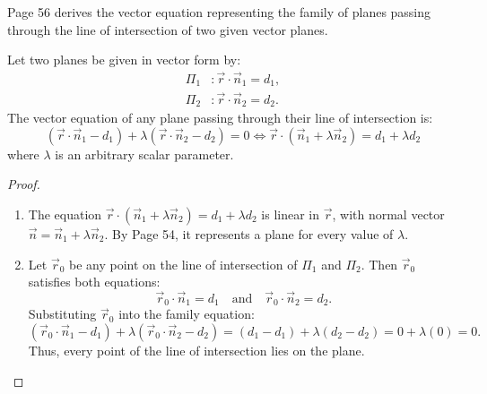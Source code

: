 \begin{conceptbox}
Page 56 derives the vector equation representing the family of planes passing through the line of intersection of two given vector planes.
\end{conceptbox}

\begin{theorembox}
Let two planes be given in vector form by:
\begin{align}
    \Pi_1 &: \vec{r} \cdot \vec{n}_1 = d_1, \\
    \Pi_2 &: \vec{r} \cdot \vec{n}_2 = d_2.
\end{align}
The vector equation of any plane passing through their line of intersection is:
\begin{equation}
    \boxed{(\vec{r} \cdot \vec{n}_1 - d_1) + \lambda(\vec{r} \cdot \vec{n}_2 - d_2) = 0 \iff \vec{r} \cdot (\vec{n}_1 + \lambda \vec{n}_2) = d_1 + \lambda d_2}
\end{equation}
where $\lambda$ is an arbitrary scalar parameter.
\end{theorembox}

\begin{proof}
\begin{enumerate}
    \item The equation $\vec{r} \cdot (\vec{n}_1 + \lambda \vec{n}_2) = d_1 + \lambda d_2$ is linear in $\vec{r}$, with normal vector $\vec{n} = \vec{n}_1 + \lambda \vec{n}_2$. By Page 54, it represents a plane for every value of $\lambda$.
    \item Let $\vec{r}_0$ be any point on the line of intersection of $\Pi_1$ and $\Pi_2$.
    Then $\vec{r}_0$ satisfies both equations:
    \begin{equation}
        \vec{r}_0 \cdot \vec{n}_1 = d_1 \quad \text{and} \quad \vec{r}_0 \cdot \vec{n}_2 = d_2.
    \end{equation}
    Substituting $\vec{r}_0$ into the family equation:
    \begin{equation}
        (\vec{r}_0 \cdot \vec{n}_1 - d_1) + \lambda(\vec{r}_0 \cdot \vec{n}_2 - d_2) = (d_1 - d_1) + \lambda(d_2 - d_2) = 0 + \lambda(0) = 0.
    \end{equation}
    Thus, every point of the line of intersection lies on the plane.
\end{enumerate}
\end{proof}

